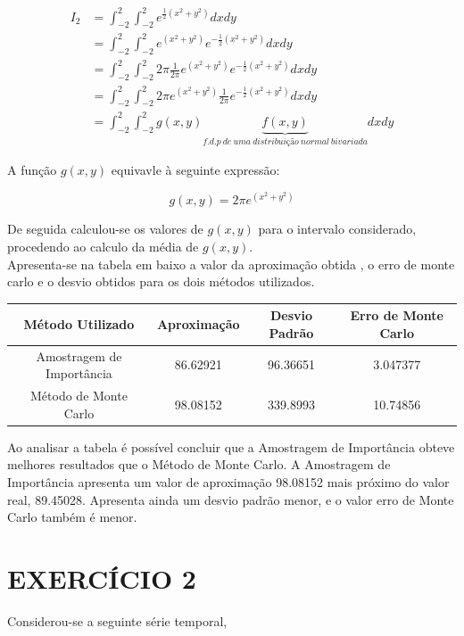 \documentclass[letterpaper,11pt]{article}
\begin{document}
\begin{align*}
I_2 & = \int_{-2}^{2} \int_{-2}^{2}e^{\frac{1}{2}(x^2+y^2)} dxdy\\
& = \int_{-2}^{2} \int_{-2}^{2} e^{(x^2+y^2)} e^{-\frac{1}{2}(x^2+y^2)}dxdy\\
& = \int_{-2}^{2} \int_{-2}^{2} 2\pi \frac{1}{2\pi} e^{(x^2+y^2)} e^{-\frac{1}{2}(x^2+y^2)}dxdy\\
& = \int_{-2}^{2} \int_{-2}^{2}2\pi e^{(x^2+y^2)} \frac{1}{2\pi} e^{-\frac{1}{2}(x^2+y^2)}dxdy\\
& = \int_{-2}^{2} \int_{-2}^{2} g(x,y)   \underbrace{f(x,y)}_{f.d.p \ de \ uma \ distribuição \ normal \ bivariada}  dxdy
\end{align*}

A função $g(x,y)$ equivavle à seguinte expressão:

\begin{equation} 
g(x,y) = 2\pi e^{(x^2+y^2)}
\end{equation}

De seguida calculou-se os valores de $g(x,y)$ para o intervalo considerado, procedendo ao calculo da média de $g(x,y)$.\\
Apresenta-se na tabela em baixo a valor da aproximação obtida , o erro de monte carlo e o desvio obtidos para os dois métodos utilizados.

\begin{center}
\begin{tabular}{|c|c|c|c|} 
\hline
Método Utilizado & Aproximação & Desvio Padrão & Erro de Monte Carlo \\
\hline
Amostragem de Importância  & 86.62921 & 96.36651 & 3.047377 \\
\hline
Método de Monte Carlo & 98.08152 & 339.8993 & 10.74856 \\
\hline
\end{tabular}
\end{center}

Ao analisar a tabela é possível concluir que a Amostragem de Importância obteve melhores resultados que o Método de Monte Carlo. A Amostragem de Importância apresenta um valor de aproximação 98.08152 mais próximo do valor real, 89.45028.  Apresenta ainda um desvio padrão menor, e o valor erro de Monte Carlo também é menor.




\section*{EXERCÍCIO 2}%
\item Considerou-se a seguinte série temporal,
\end{document}
